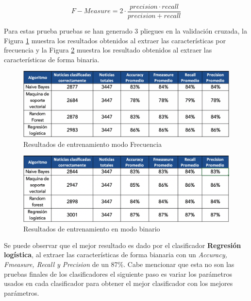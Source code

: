 \begin{equation}\label{eq:4}
	 F-Measure = 2 \cdot \frac{precision \cdot recall}{precision+recall}
\end{equation}





Para estas prueba pruebas se han generado 3 pliegues en la validación cruzada, la Figura \ref{fig:matrizfrecuencia} muestra los resultados obtenidos al extraer las características por frecuencia y la Figura \ref{fig:matrizbinario} muestra los resultado obtenidos al extraer las características de forma binaria.

\begin{figure}[ht]
\centering
\includegraphics[scale=0.45]{imagenes/Resultados/MatrizFrecuencia.png}
\caption{Resultados de entrenamiento modo Frecuencia}
\label{fig:matrizfrecuencia}
\end{figure}

\begin{figure}[ht]
\centering
\includegraphics[scale=0.45]{imagenes/Resultados/MatrizBinario.png}
\caption{Resultados de entrenamiento en modo binario}
\label{fig:matrizbinario}
\end{figure}


Se puede observar que el mejor resultado es dado por el clasificador \textbf{Regresión logística}, al extraer las características de forma bianaria con un \textit{Accuracy, Fmeasure, Recall y Precision} de un 87\%. Cabe mencionar que esta no son las pruebas finales de los clasificadores el siguiente paso es variar los parámetros usados en cada clasificador para obtener el mejor clasificador con los mejores parámetros.